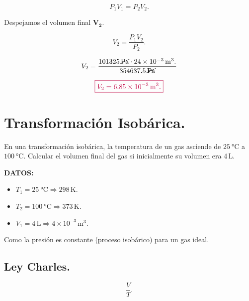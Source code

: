 \documentclass[a4paper,12pt]{article} %
\begin{document}
\[ P_1 V_1 = P_2 V_2. \]

\begin{justify}
	Despejamos el volumen final \( \mathbf{V_2} \).
\end{justify}

\[ V_2 = \frac{P_1 V_2}{P_2}. \]

\vspace{\baselineskip}

\[ V_2 = \frac{101325 \, \cancel{\mathrm{Pa}} \cdot 24 \times 10^{-3} \, \mathrm{m}^3.}{ 354637.5 \, \cancel{\mathrm{Pa}} } \]

\vspace{\baselineskip}

\[ \textcolor{purple}{\boxed{ V_2 = 6.85 \times 10^{-3} \, \mathrm{m}^3 .}} \]

\section{Transformación Isobárica.}

\begin{justify}
	En una transformación isobárica, la temperatura de un gas asciende de \( \SI{25}{\degreeCelsius} \) a \( \SI{100}{\degreeCelsius} \). Calcular el volumen final del gas si inicialmente su volumen era \( 4 \, \mathrm{L} \).
\end{justify}

\begin{justify}
	\textbf{DATOS:}
\end{justify}

\begin{itemize}
	\item \( T_1 = \SI{25}{\degreeCelsius}  \Rightarrow 298 \, \mathrm{K}. \)
	\item \( T_2 = \SI{100}{\degreeCelsius}  \Rightarrow 373 \, \mathrm{K}. \)
	\item \( V_1 = 4 \, \mathrm{L} \Rightarrow 4 \times 10^{-3} \, \mathrm{m}^3. \)
\end{itemize}

\begin{justify}
	Como la presión es constante (proceso isobárico) para un gas ideal.
\end{justify}

\subsection{Ley Charles.}

\[ \frac{V}{T}. \]
\end{document}
